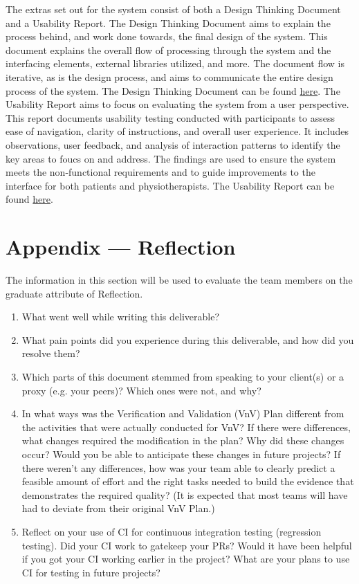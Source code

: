 \documentclass[12pt, titlepage]{article}
\begin{document}
The extras set out for the system consist of both a Design Thinking Document and a Usability Report. The Design Thinking Document aims to explain the process behind, and work done towards, the final design of the system. This document explains the overall flow of processing through the system and the interfacing elements, external libraries utilized, and more. The document flow is iterative, as is the design process, and aims to communicate the entire design process of the system. The Design Thinking Document can be found \href{../Extras/DesignThinking}{here}. The Usability Report aims to focus on evaluating the system from a user perspective. This report documents usability testing conducted with participants to assess ease of navigation, clarity of instructions, and overall user experience. It includes observations, user feedback, and analysis of interaction patterns to identify the key areas to foucs on and address. The findings are used to ensure the system meets the non-functional requirements and to guide improvements to the interface for both patients and physiotherapists. The Usability Report can be found \href{../Extras/UsabilityTesting/UsabilityReport.pdf}{here}.




\newpage{}
\section*{Appendix --- Reflection}

The information in this section will be used to evaluate the team members on the
graduate attribute of Reflection.



\begin{enumerate}
  \item What went well while writing this deliverable? 
  \item What pain points did you experience during this deliverable, and how
    did you resolve them?
  \item Which parts of this document stemmed from speaking to your client(s) or
  a proxy (e.g. your peers)? Which ones were not, and why?
  \item In what ways was the Verification and Validation (VnV) Plan different
  from the activities that were actually conducted for VnV?  If there were
  differences, what changes required the modification in the plan?  Why did
  these changes occur?  Would you be able to anticipate these changes in future
  projects?  If there weren't any differences, how was your team able to clearly
  predict a feasible amount of effort and the right tasks needed to build the
  evidence that demonstrates the required quality?  (It is expected that most
  teams will have had to deviate from their original VnV Plan.)
  \item Reflect on your use of CI for continuous integration testing (regression
  testing). Did your CI work to gatekeep your PRs?  Would it have been helpful
  if you got your CI working earlier in the project?  What are your plans to use
  CI for testing in future projects?
\end{enumerate}
\end{document}
